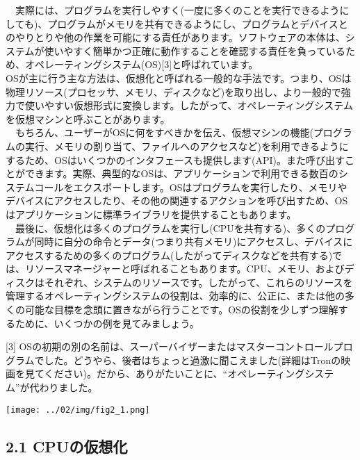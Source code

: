 　実際には、プログラムを実行しやすく(一度に多くのことを実行できるようにしても)、プログラムがメモリを共有できるようにし、プログラムとデバイスとのやりとりや他の作業を可能にする責任があります。ソフトウェアの本体は、システムが使いやすく簡単かつ正確に動作することを確認する責任を負っているため、オペレーティングシステム(OS){[}3{]}と呼ばれています。\\
OSが主に行う主な方法は、仮想化と呼ばれる一般的な手法です。つまり、OSは物理リソース(プロセッサ、メモリ、ディスクなど)を取り出し、より一般的で強力で使いやすい仮想形式に変換します。したがって、オペレーティングシステムを仮想マシンと呼ぶことがあります。\\
　もちろん、ユーザーがOSに何をすべきかを伝え、仮想マシンの機能(プログラムの実行、メモリの割り当て、ファイルへのアクセスなど)を利用できるようにするため、OSはいくつかのインタフェースも提供します(API)。また呼び出すことができます。実際、典型的なOSは、アプリケーションで利用できる数百のシステムコールをエクスポートします。OSはプログラムを実行したり、メモリやデバイスにアクセスしたり、その他の関連するアクションを呼び出すため、OSはアプリケーションに標準ライブラリを提供することもあります。\\
　最後に、仮想化は多くのプログラムを実行し(CPUを共有する)、多くのプログラムが同時に自分の命令とデータ(つまり共有メモリ)にアクセスし、デバイスにアクセスするための多くのプログラム(したがってディスクなどを共有する)では、リソースマネージャーと呼ばれることもあります。CPU、メモリ、およびディスクはそれぞれ、システムのリソースです。したがって、これらのリソースを管理するオペレーティングシステムの役割は、効率的に、公正に、または他の多くの可能な目標を念頭に置きながら行うことです。OSの役割を少しずつ理解するために、いくつかの例を見てみましょう。

{[}3{]}
OSの初期の別の名前は、スーパーバイザーまたはマスターコントロールプログラムでした。どうやら、後者はちょっと過激に聞こえました(詳細はTronの映画を見てください)。だから、ありがたいことに、``オペレーティングシステム''が代わりました。

\texttt{[image: ../02/img/fig2\_1.png]}

\hypertarget{cpuux306eux4eeeux60f3ux5316}{%
\subsection*{2.1 CPUの仮想化}\label{cpuux306eux4eeeux60f3ux5316}}

